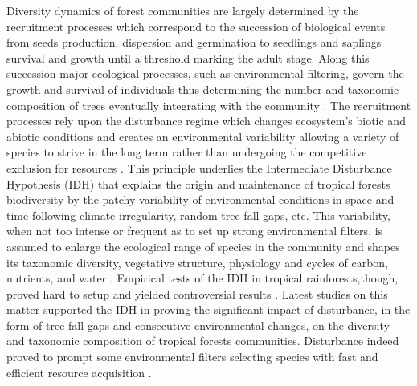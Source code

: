 \documentclass[fleqn,10pt]{ArtEcoFoG} %
\begin{document}
Diversity dynamics of forest communities are largely determined by the
recruitment processes which correspond to the succession of biological
events from seeds production, dispersion and germination to seedlings
and saplings survival and growth until a threshold marking the adult
stage. Along this succession major ecological processes, such as
environmental filtering, govern the growth and survival of individuals
thus determining the number and taxonomic composition of trees
eventually integrating with the community
\citep{Ackerly2003, GourletFleury2005}. The recruitment processes rely
upon the disturbance regime which changes ecosystem's biotic and abiotic
conditions and creates an environmental variability allowing a variety
of species to strive in the long term rather than undergoing the
competitive exclusion for resources \citep{Denslow1980}. This principle
underlies the Intermediate Disturbance Hypothesis (IDH) that explains
the origin and maintenance of tropical forests biodiversity by the
patchy variability of environmental conditions in space and time
following climate irregularity, random tree fall gaps, etc. This
variability, when not too intense or frequent as to set up strong
environmental filters, is assumed to enlarge the ecological range of
species in the community \citep{Molino2001, Bongers2009} and shapes its
taxonomic diversity, vegetative structure, physiology and cycles of
carbon, nutrients, and water \citep{Anderson-Teixeira2013}. Empirical
tests of the IDH in tropical rainforests,though, proved hard to setup
and yielded controversial results
\citep{Hubbell1999, Molino2001, Sheil2003}. Latest studies on this
matter supported the IDH in proving the significant impact of
disturbance, in the form of tree fall gaps and consecutive environmental
changes, on the diversity and taxonomic composition of tropical forests
communities. Disturbance indeed proved to prompt some environmental
filters selecting species with fast and efficient resource acquisition
\citep[Mirabel2018, in prep.]{Baraloto2012a}.
\end{document}
